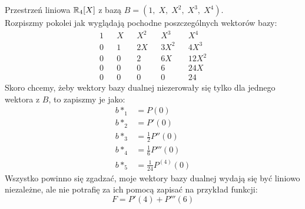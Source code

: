 \documentclass{article}
\begin{document}
\ttfamily
Przestrzeń liniowa $\mathbb{R}_4[X]$ z bazą $B=(1,\;X,\;X^2,\;X^3,\;X^4)$.\smallskip\\
Rozpiszmy pokolei jak wyglądają pochodne poszczególnych wektorów bazy:
$$\begin{matrix}
    1 && X && X^2 && X^3  && X^4\\
    0 && 1 && 2X  && 3X^2 && 4X^3\\
    0 && 0 && 2   && 6X   && 12X^2\\
    0 && 0 && 0   && 6    && 24X\\
    0 && 0 && 0   && 0    && 24
\end{matrix}$$
Skoro chcemy, żeby wektory bazy dualnej niezerowały się tylko dla jednego wektora z $B$, to zapiszmy je jako:
\begin{align*}
    b*_1&=P(0)\\
    b*_2&=P'(0)\\
    b*_3&=\frac12P''(0)\\
    b*_4&=\frac16P'''(0)\\
    b*_5&=\frac1{24}P^{(4)}(0)
\end{align*}
Wszystko powinno się zgadzać, moje wektory bazy dualnej wydają się być liniowo niezależne, ale nie potrafię za ich pomocą zapisać na przykład funkcji:
$$F=P'(4)+P'''(6)$$
\end{document}
